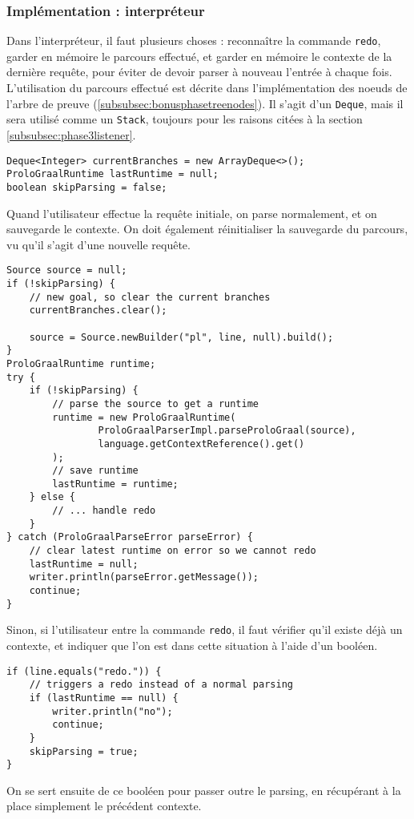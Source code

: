 \documentclass[../report.tex]{subfiles}
\begin{document}
\subsubsection{Implémentation : interpréteur}
Dans l'interpréteur, il faut plusieurs choses : reconnaître la commande \texttt{redo}, garder en mémoire le parcours effectué, et garder en mémoire le contexte de la dernière requête, pour éviter de devoir parser à nouveau l'entrée à chaque fois. L'utilisation du parcours effectué est décrite dans l'implémentation des noeuds de l'arbre de preuve (\ref{subsubsec:bonusphasetreenodes}). Il s'agit d'un \texttt{Deque}, mais il sera utilisé comme un \texttt{Stack}, toujours pour les raisons citées à la section \ref{subsubsec:phase3listener}.
\begin{verbatim}
Deque<Integer> currentBranches = new ArrayDeque<>();
ProloGraalRuntime lastRuntime = null;
boolean skipParsing = false;
\end{verbatim}
Quand l'utilisateur effectue la requête initiale, on parse normalement, et on sauvegarde le contexte. On doit également réinitialiser la sauvegarde du parcours, vu qu'il s'agit d'une nouvelle requête.
\begin{verbatim}
Source source = null;
if (!skipParsing) {
    // new goal, so clear the current branches
    currentBranches.clear();

    source = Source.newBuilder("pl", line, null).build();
}
ProloGraalRuntime runtime;
try {
    if (!skipParsing) {
        // parse the source to get a runtime
        runtime = new ProloGraalRuntime(
                ProloGraalParserImpl.parseProloGraal(source),
                language.getContextReference().get()
        );
        // save runtime
        lastRuntime = runtime;
    } else {
        // ... handle redo
    }
} catch (ProloGraalParseError parseError) {
    // clear latest runtime on error so we cannot redo
    lastRuntime = null;
    writer.println(parseError.getMessage());
    continue;
}
\end{verbatim}
Sinon, si l'utilisateur entre la commande \texttt{redo}, il faut vérifier qu'il existe déjà un contexte, et indiquer que l'on est dans cette situation à l'aide d'un booléen. 
\begin{verbatim}
if (line.equals("redo.")) {
    // triggers a redo instead of a normal parsing
    if (lastRuntime == null) {
        writer.println("no");
        continue;
    }
    skipParsing = true;
}
\end{verbatim}
On se sert ensuite de ce booléen pour passer outre le parsing, en récupérant à la place simplement le précédent contexte.
\end{document}
